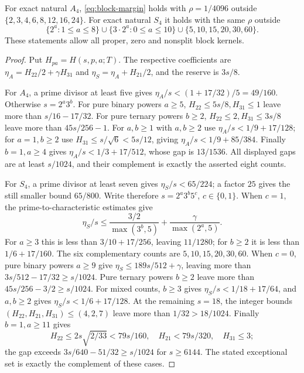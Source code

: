\begin{theorem}
\label{thm:four-local-capacity}
For exact natural $A_4$, \eqref{eq:block-margin} holds with
$\rho=1/4096$ outside $\{2,3,4,6,8,12,16,24\}$.
For exact natural $S_4$ it holds with the same $\rho$ outside
\[
 \{2^a:1\leq a\leq8\}\cup
 \{3\cdot2^a:0\leq a\leq10\}\cup\{5,10,15,20,30,60\}.
\]
These statements allow all proper, zero and nonsplit block kernels.
\end{theorem}
\begin{proof}
Put $H_{pa}=H(s,p,a;T)$. The respective coefficients are
$\eta_A=H_{22}/2+\gamma H_{31}$ and
$\eta_S=\eta_A+H_{21}/2$, and the reserve is $3s/8$.

For $A_4$, a prime divisor at least five gives
$\eta_A/s<(1+17/32)/5=49/160$.
Otherwise $s=2^a3^b$. For pure binary powers $a\geq5$,
$H_{22}\leq5s/8,H_{31}\leq1$ leave more than $s/16-17/32$.
For pure ternary powers $b\geq2$,
$H_{22}\leq2,H_{31}\leq3s/8$ leave more than $45s/256-1$.
For $a,b\geq1$ with $a,b\geq2$ use
$\eta_A/s<1/9+17/128$; for $a=1,b\geq2$ use
$H_{31}\leq s/\sqrt6<5s/12$, giving
$\eta_A/s<1/9+85/384$. Finally $b=1,a\geq4$ gives
$\eta_A/s<1/3+17/512$, whose gap is $13/1536$.
All displayed gaps are at least $s/1024$, and their complement
is exactly the asserted eight counts.

For $S_4$, a prime divisor at least seven gives
$\eta_S/s<65/224$; a factor $25$ gives the still smaller bound
$65/800$. Write therefore $s=2^a3^b5^c$, $c\in\{0,1\}$.
When $c=1$, the prime-to-characteristic estimates give
\[
 \eta_S/s\leq\frac{3/2}{\max(3^b,5)}+
                         \frac{\gamma}{\max(2^a,5)}.
\]
For $a\geq3$ this is less than $3/10+17/256$, leaving
$11/1280$; for $b\geq2$ it is less than $1/6+17/160$.
The six complementary counts are $5,10,15,20,30,60$.
When $c=0$, pure binary powers $a\geq9$ give
$\eta_S\leq189s/512+\gamma$, leaving more than
$3s/512-17/32\geq s/1024$. Pure ternary powers $b\geq2$
leave more than $45s/256-3/2\geq s/1024$.
For mixed counts, $b\geq3$ gives
$\eta_S/s<1/18+17/64$, and $a,b\geq2$ gives
$\eta_S/s<1/6+17/128$. At the remaining $s=18$, the integer
bounds $(H_{22},H_{21},H_{31})\leq(4,2,7)$ leave more than
$1/32>18/1024$. Finally $b=1,a\geq11$ gives
\[
 H_{22}\leq2s\sqrt{2/33}<79s/160,\quad
 H_{21}<79s/320,\quad H_{31}\leq3;
\]
the gap exceeds $3s/640-51/32\geq s/1024$ for $s\geq6144$.
The stated exceptional set is exactly the complement of these cases.
\end{proof}

